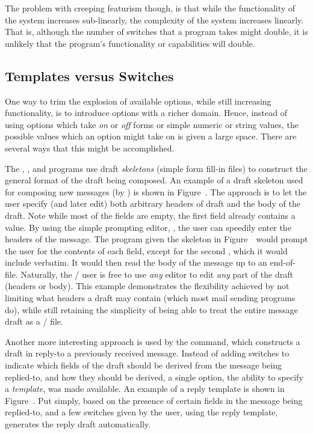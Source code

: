 The problem with creeping featurism though,
is that while the functionality of the system increases sub-linearly,
the complexity of the system increases linearly.
That is,
although the number of switches that a program takes might double,
it is unlikely that the program's functionality or capabilities will double.

\subsection{Templates versus Switches}		%
One way to trim the explosion of available options,
while still increasing functionality,
is to introduce options with a richer domain.
Hence,
instead of using options which take {\it on} or {\it off} forms
or simple numeric or string values,
the possible values which an option might take on is given a large space.
There are several ways that this might be accomplished.

The , , and  programs
use draft {\it skeletons} (simple form fill-in files) to construct the
general format of the draft being composed.
An example of a draft skeleton used for composing new messages
(by ) is shown in Figure~\components.
The approach is to let the user specify (and later edit) both arbitrary
headers of draft and the body of the draft.
Note while most of the fields are empty,
the first  field already contains a value.
By using the simple prompting editor, ,
the user can speedily enter the headers of the message.
The  program given the skeleton in Figure~\components\ would
prompt the user for the contents of each field,
except for the second ,
which it would include verbatim.
It would then read the body of the message up to an end-of-file.
Naturally,
the \MH/ user is free to use {\it any} editor to edit {\it any} part of the
draft (headers or body).
This example 
demonstrates the flexibility achieved by not limiting what headers a
draft may contain (which most mail sending programs do),
while still retaining the simplicity of being able to treat the entire
message draft as a \unix/ file.

Another more interesting approach is used by the  command,
which constructs a draft in reply-to a previously received message.
Instead of adding switches to indicate which fields of the draft should be
derived from the message being replied-to,
and how they should be derived,
a single option,
the ability to specify a {\it template}, was made available.
An example of a reply template is shown in Figure~\replcomps.
Put simply,
based on the presence of certain fields in the message being replied-to,
and a few switches given by the user,
using the reply template,
 generates the reply draft automatically.

